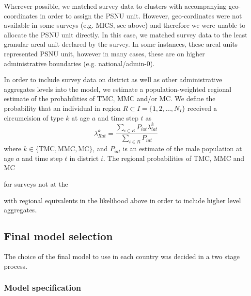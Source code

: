 \documentclass{article}
\begin{document}
\begin{appendix}
Wherever possible, we matched survey data to clusters with accompanying geo-coordinates in order to assign the PSNU unit. However, geo-cordinates were not available in some surveys (e.g. MICS, see above) and therefore we were unable to allocate the PSNU unit directly. In this case, we matched survey data to the least granular areal unit declared by the survey. In some instances, these areal units represented PSNU unit, however in many cases, these are on higher administrative boundaries (e.g. national/admin-0). 

In order to include survey data on district as well as other administrative aggregates levels into the model, we estimate a population-weighted regional estimate of the probabilities of TMC, MMC and/or MC. We define the probability that an individual in region $ R \subset I = \{1, 2, \ldots, N_I\}$ received a circumcision of type $k$ at age $a$ and time step $t$ as 
\begin{equation*}
	\lambda^{k}_{Rat} = \frac{\sum_{i\in R}P_{iat}\lambda^{k}_{iat}}{\sum_{i\in R}P_{iat}}
\end{equation*}
where $k\in \{\textrm{TMC}, \textrm{MMC}, \textrm{MC}\}$, and $P_{iat}$ is an estimate of the male population at age $a$ and time step $t$ in district $i$. The regional probabilities of TMC, MMC and MC 


for surveys not at the 

with regional equivalents in the likelihood above in order to include higher level aggregates. 


\subsection{Final model selection}
\label{sec::modelcheck}


The choice of the final model to use in each country was decided in a two stage process. 







\subsubsection{Model specification}


\end{appendix}
\end{document}
